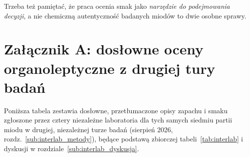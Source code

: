 \documentclass[12pt,a4paper]{article}
\begin{document}
Trzeba też pamiętać, że praca ocenia smak jako \emph{narzędzie do podejmowania
decyzji}, a nie chemiczną autentyczność badanych miodów to dwie osobne sprawy.



\clearpage
\section*{Załącznik A: dosłowne oceny organoleptyczne z drugiej tury badań}
\label{app:interlab_raw}

Poniższa tabela zestawia dosłowne, przetłumaczone opisy zapachu i smaku zgłoszone przez
cztery niezależne laboratoria dla tych samych siedmiu partii miodu w drugiej,
niezależnej turze badań (sierpień 2026, rozdz.~\ref{sub:interlab_metody}), będące
podstawą zbiorczej tabeli~\ref{tab:interlab} i dyskusji w
rozdziale~\ref{sub:interlab_dyskusja}.
\end{document}
